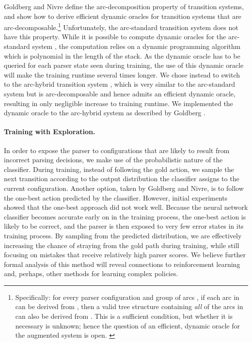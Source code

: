 \documentclass[11pt]{article}
\begin{document}
Goldberg and Nivre  define the arc-decomposition
property of transition systems, and show how to derive efficient
dynamic oracles for transition systems that are arc-decomposable.\footnote{Specifically: 
for every parser configuration  and group of arcs , if
each arc in  can be derived from , then a valid tree structure
containing \emph{all} of the arcs in  can also be derived from .
This is a sufficient condition, but whether it is necessary is
unknown; hence the question of an efficient,  dynamic oracle for the augmented system is open. \label{fn:arc-decomposition}}
Unfortunately,
the arc-standard transition system does not have this property.  While it is
possible to compute dynamic oracles for the arc-standard system
\cite{goldberg2013tabular}, the computation relies on a dynamic programming
algorithm which is polynomial in the length of the stack.
As the dynamic oracle has to be queried for each parser state seen during
training, the use of this dynamic oracle will make the training runtime
several times longer.
We chose instead to switch to the arc-hybrid transition system \cite{kuhlmann11dynamic}, 
which is very
similar to the arc-standard system but is arc-decomposable and hence admits an
efficient  dynamic oracle, resulting in only negligible increase
to training runtime.
We implemented the dynamic oracle to the arc-hybrid system as described by
Goldberg .

\paragraph{Training with Exploration.} In order to expose the parser to configurations that are likely to result from
incorrect parsing decisions, we make use of the probabilistic nature of the
classifier.
During training, instead of following the gold action, 
we sample the next transition according to
the output distribution the classifier assigns to the current
configuration. Another option, taken by Goldberg and Nivre, is to
follow the one-best action predicted by the classifier.  However, initial
experiments showed that the one-best approach did not work well. Because the
neural network classifier becomes accurate early on in the training process, the
one-best action is likely to be correct, and the parser is then exposed to very
few error states in its training process. By sampling from the predicted
distribution, we are effectively increasing the chance of straying from the gold
path during training, while still focusing on mistakes that receive relatively
high parser scores.
We believe further formal analysis of this method will reveal
connections to reinforcement learning and, perhaps, other methods for
learning complex policies.
\end{document}
